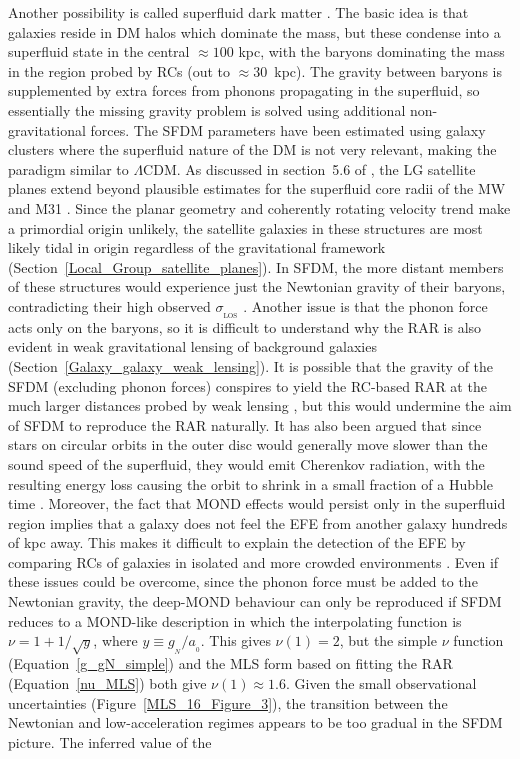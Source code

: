 \documentclass[fleqn,usenatbib,useAMS,onecolumn]{mnras} %
\begin{document}
Another possibility is called superfluid dark matter \citep[SFDM;][]{Berezhiani_2015, Berezhiani_2016}. The basic idea is that galaxies reside in DM halos which dominate the mass, but these condense into a superfluid state in the central $\approx 100$ kpc, with the baryons dominating the mass in the region probed by RCs (out to $\approx 30$~kpc). The gravity between baryons is supplemented by extra forces from phonons propagating in the superfluid, so essentially the missing gravity problem is solved using additional non-gravitational forces. The SFDM parameters have been estimated using galaxy clusters \citep{Hodson_2017_SFDM_clusters} where the superfluid nature of the DM is not very relevant, making the paradigm similar to $\Lambda$CDM. As discussed in section~5.6 of \citet{Roshan_2021_disc_stability}, the LG satellite planes extend beyond plausible estimates for the superfluid core radii of the MW and M31 \citep{Berezhiani_2016, Hossenfelder_2020}. Since the planar geometry and coherently rotating velocity trend make a primordial origin unlikely, the satellite galaxies in these structures are most likely tidal in origin regardless of the gravitational framework (Section~\ref{Local_Group_satellite_planes}). In SFDM, the more distant members of these structures would experience just the Newtonian gravity of their baryons, contradicting their high observed $\sigma_{_\text{LOS}}$ \citep{McGaugh_Wolf_2010, McGaugh_2013a, McGaugh_2013b}. Another issue is that the phonon force acts only on the baryons, so it is difficult to understand why the RAR is also evident in weak gravitational lensing of background galaxies (Section~\ref{Galaxy_galaxy_weak_lensing}). It is possible that the gravity of the SFDM (excluding phonon forces) conspires to yield the RC-based RAR at the much larger distances probed by weak lensing \citep{Brimioulle_2013, Milgrom_2013, Brouwer_2017, Brouwer_2021}, but this would undermine the aim of SFDM to reproduce the RAR naturally. It has also been argued that since stars on circular orbits in the outer disc would generally move slower than the sound speed of the superfluid, they would emit Cherenkov radiation, with the resulting energy loss causing the orbit to shrink in a small fraction of a Hubble time \citep{Mistele_2021}. Moreover, the fact that MOND effects would persist only in the superfluid region implies that a galaxy does not feel the EFE from another galaxy hundreds of kpc away. This makes it difficult to explain the detection of the EFE by comparing RCs of galaxies in isolated and more crowded environments \citep{Chae_2020_EFE, Chae_2021}. Even if these issues could be overcome, since the phonon force must be added to the Newtonian gravity, the deep-MOND behaviour can only be reproduced if SFDM reduces to a MOND-like description in which the interpolating function is $\nu = 1 + 1/\sqrt{y}$, where $y \equiv g_{_N}/a_{_0}$. This gives $\nu \left( 1 \right) = 2$, but the simple $\nu$ function (Equation~\ref{g_gN_simple}) and the MLS form based on fitting the RAR (Equation~\ref{nu_MLS}) both give $\nu \left( 1 \right) \approx 1.6$. Given the small observational uncertainties (Figure~\ref{MLS_16_Figure_3}), the transition between the Newtonian and low-acceleration regimes appears to be too gradual in the SFDM picture. The inferred value of the 
\end{document}
